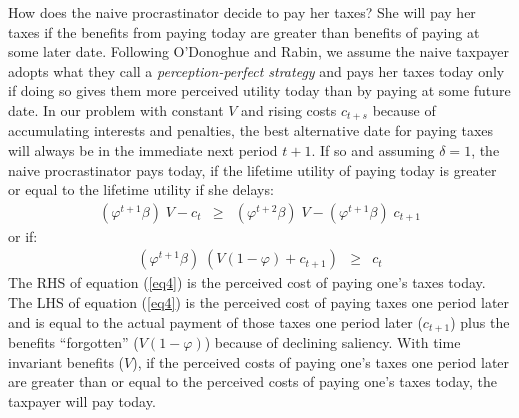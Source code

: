 \documentclass[12pt]{article}
\begin{document}
How does the naive procrastinator decide to pay her taxes?  She will
pay her taxes if the benefits from paying today are greater than
benefits of paying at some later date.  Following O'Donoghue and
Rabin, we assume the naive taxpayer adopts what they call a
\textit{perception-perfect strategy} and pays her taxes today only if
doing so gives them more perceived utility today than by paying at
some future date.  In our problem with constant $V$ and rising costs
$c_{t+s}$ because of accumulating interests and penalties, the best
alternative date for paying taxes will always be in the immediate next
period $ t + 1$.  If so and assuming $\delta=1$, the naive
procrastinator pays today, if the lifetime utility of paying today is
greater or equal to the lifetime utility if she delays:
\begin{eqnarray}\label{eq3}
(\varphi^{t+1} \beta) \; V - c_ t &\ge& (\varphi^{t+2} \beta) \; V -
  (\varphi^{t+1} \beta) \; c_ {t+1}
\end{eqnarray}
or if: 
\begin{eqnarray}\label{eq4}
(\varphi^{t+1} \beta) \; (V (1-\varphi) + c_{t+1}) &\ge& c_ {t}
\end{eqnarray}
The RHS of equation (\ref{eq4}) is the perceived cost of paying one's
taxes today.  The LHS of equation (\ref{eq4}) is the perceived cost of
paying taxes one period later and is equal to the actual payment of
those taxes one period later ($c_{t+1}$) plus the benefits
``forgotten'' ($V(1 - \varphi)$) because of declining saliency. With time invariant benefits ($V$), if
the perceived costs of paying one's taxes one period later are greater
than or equal to the perceived costs of paying one's taxes today, the
taxpayer will pay today.
\end{document}
